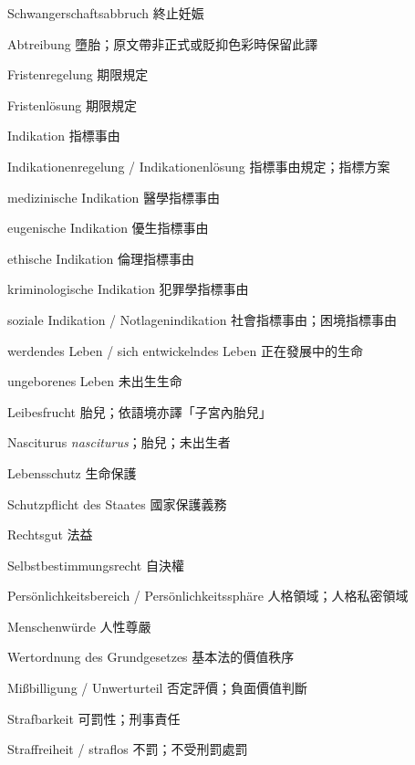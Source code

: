 \documentclass[12pt]{article}
\begin{document}
\begin{termbox}
\vspace{0.45em}
\begin{termcolumns}
\begin{termitems}
\item[Schwangerschaftsabbruch] 終止妊娠
\item[Abtreibung] 墮胎；原文帶非正式或貶抑色彩時保留此譯
\item[Fristenregelung] 期限規定
\item[Fristenlösung] 期限規定
\item[Indikation] 指標事由
\item[Indikationenregelung / Indikationenlösung] 指標事由規定；指標方案
\item[medizinische Indikation] 醫學指標事由
\item[eugenische Indikation] 優生指標事由
\item[ethische Indikation] 倫理指標事由
\item[kriminologische Indikation] 犯罪學指標事由
\item[soziale Indikation / Notlagenindikation] 社會指標事由；困境指標事由
\item[werdendes Leben / sich entwickelndes Leben] 正在發展中的生命
\item[ungeborenes Leben] 未出生生命
\item[Leibesfrucht] 胎兒；依語境亦譯「子宮內胎兒」
\item[Nasciturus] \textit{nasciturus}；胎兒；未出生者
\item[Lebensschutz] 生命保護
\item[Schutzpflicht des Staates] 國家保護義務
\item[Rechtsgut] 法益
\item[Selbstbestimmungsrecht] 自決權
\item[Persönlichkeitsbereich / Persönlichkeitssphäre] 人格領域；人格私密領域
\item[Menschenwürde] 人性尊嚴
\item[Wertordnung des Grundgesetzes] 基本法的價值秩序
\item[Mißbilligung / Unwerturteil] 否定評價；負面價值判斷
\item[Strafbarkeit] 可罰性；刑事責任
\item[Straffreiheit / straflos] 不罰；不受刑罰處罰

\end{termitems}
\end{termcolumns}
\end{termbox}
\end{document}
